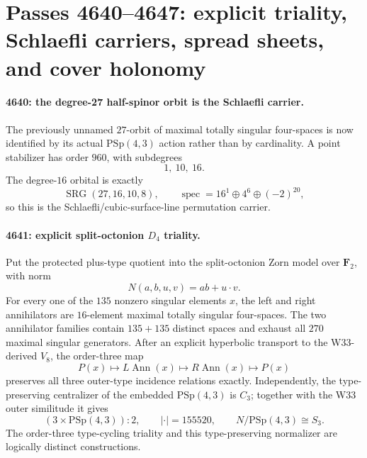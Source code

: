 \section{Passes 4640--4647: explicit triality, Schlaefli carriers, spread sheets, and cover holonomy}
\label{sec:pass4640-4647}

\paragraph{4640: the degree-27 half-spinor orbit is the Schlaefli carrier.}
The previously unnamed $27$-orbit of maximal totally singular four-spaces is now
identified by its actual $\mathrm{PSp}(4,3)$ action rather than by cardinality.
A point stabilizer has order $960$, with subdegrees
\[
1,\ 10,\ 16.
\]
The degree-$16$ orbital is exactly
\[
\operatorname{SRG}(27,16,10,8),
\qquad
\operatorname{spec}=16^1\oplus4^6\oplus(-2)^{20},
\]
so this is the Schlaefli/cubic-surface-line permutation carrier.

\paragraph{4641: explicit split-octonion $D_4$ triality.}
Put the protected plus-type quotient into the split-octonion Zorn model over
$\mathbf F_2$, with norm
\[
N(a,b,u,v)=ab+u\!\cdot\!v.
\]
For every one of the $135$ nonzero singular elements $x$, the left and right
annihilators are $16$-element maximal totally singular four-spaces.  The two
annihilator families contain $135+135$ distinct spaces and exhaust all $270$
maximal singular generators.  After an explicit hyperbolic transport to the
W33-derived $V_8$, the order-three map
\[
P(x)\longmapsto L\!\operatorname{Ann}(x)
\longmapsto R\!\operatorname{Ann}(x)
\longmapsto P(x)
\]
preserves all three outer-type incidence relations exactly.  Independently,
the type-preserving centralizer of the embedded $\mathrm{PSp}(4,3)$ is $C_3$;
together with the W33 outer similitude it gives
\[
(3\times \mathrm{PSp}(4,3)){:}2,
\qquad |\cdot|=155520,
\qquad N/\mathrm{PSp}(4,3)\cong S_3.
\]
The order-three type-cycling triality and this type-preserving normalizer are
logically distinct constructions.

